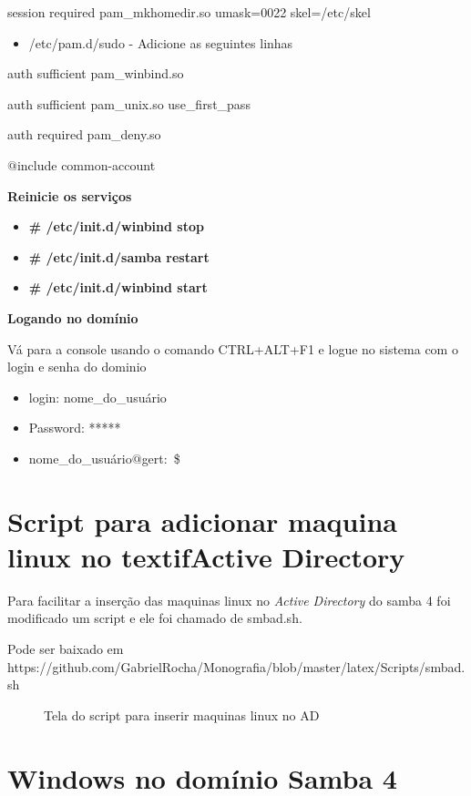 session required pam\_mkhomedir.so umask=0022 skel=/etc/skel

\begin{itemize}
	\item {/etc/pam.d/sudo} - Adicione as seguintes linhas
\end{itemize}

auth sufficient pam\_winbind.so

auth sufficient pam\_unix.so use\_first\_pass

auth required   pam\_deny.so

$@$include common-account



\textbf{Reinicie os serviços}

\begin{itemize}
	\item \textbf{\# /etc/init.d/winbind stop}
	\item \textbf{\# /etc/init.d/samba restart}
	\item \textbf{\# /etc/init.d/winbind start}
\end{itemize}

\textbf{Logando no domínio}

Vá para a console usando o comando CTRL+ALT+F1 e logue no sistema com o login e senha do dominio

\begin{itemize}
	\item {login: nome\_do\_usuário}
	\item {Password: *****}
	\item {nome\_do\_usuário$@$gert:~\$}
\end{itemize}

\section{Script para adicionar maquina linux no textif{Active Directory}}

Para facilitar a inserção das maquinas linux no \textit{Active Directory} do samba 4 foi modificado um script e ele foi chamado de smbad.sh. 

Pode ser baixado em https://github.com/GabrielRocha/Monografia/blob/master/latex/Scripts/smbad.sh

\begin{figure}[ht]
   	\centering
   	\caption{Tela do script para inserir maquinas linux no AD}
    \label{smbad}
\end{figure}

\section{Windows no domínio Samba 4}